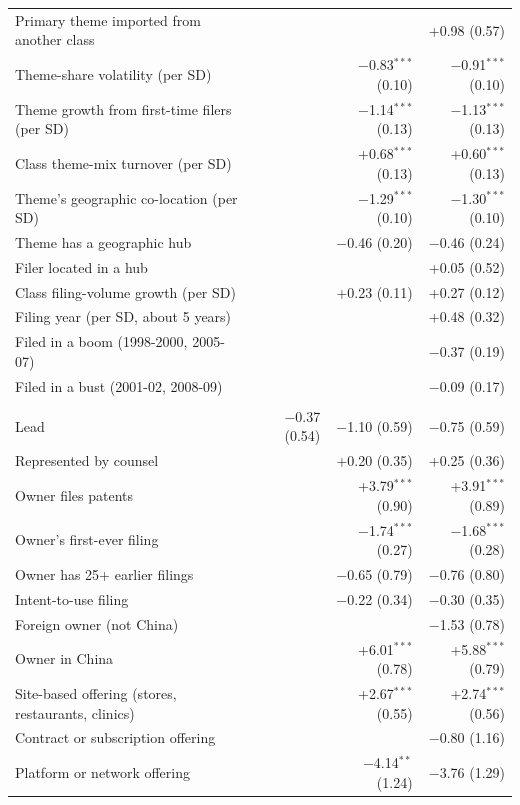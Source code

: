 \begin{small}
\begin{longtable}{>{\raggedright\arraybackslash}p{5.9cm}rrr}
\quad Primary theme imported from another class & &  & +0.98 (0.57) \\
\quad Theme-share volatility (per SD) & & $-$0.83$^{***}$ (0.10) & $-$0.91$^{***}$ (0.10) \\
\quad Theme growth from first-time filers (per SD) & & $-$1.14$^{***}$ (0.13) & $-$1.13$^{***}$ (0.13) \\
\quad Class theme-mix turnover (per SD) & & +0.68$^{***}$ (0.13) & +0.60$^{***}$ (0.13) \\
\quad Theme's geographic co-location (per SD) & & $-$1.29$^{***}$ (0.10) & $-$1.30$^{***}$ (0.10) \\
\quad Theme has a geographic hub & & $-$0.46 (0.20) & $-$0.46 (0.24) \\
\quad Filer located in a hub & &  & +0.05 (0.52) \\
\quad Class filing-volume growth (per SD) & & +0.23 (0.11) & +0.27 (0.12) \\
\quad Filing year (per SD, about 5 years) & &  & +0.48 (0.32) \\
\quad Filed in a boom (1998-2000, 2005-07) & &  & $-$0.37 (0.19) \\
\quad Filed in a bust (2001-02, 2008-09) & &  & $-$0.09 (0.17) \\
\addlinespace\multicolumn{4}{l}{\textbf{B. Change in the value of atypicality (points)}} \\
Lead & $-$0.37 (0.54) & $-$1.10 (0.59) & $-$0.75 (0.59) \\
\quad Represented by counsel & & +0.20 (0.35) & +0.25 (0.36) \\
\quad Owner files patents & & +3.79$^{***}$ (0.90) & +3.91$^{***}$ (0.89) \\
\quad Owner's first-ever filing & & $-$1.74$^{***}$ (0.27) & $-$1.68$^{***}$ (0.28) \\
\quad Owner has 25+ earlier filings & & $-$0.65 (0.79) & $-$0.76 (0.80) \\
\quad Intent-to-use filing & & $-$0.22 (0.34) & $-$0.30 (0.35) \\
\quad Foreign owner (not China) & &  & $-$1.53 (0.78) \\
\quad Owner in China & & +6.01$^{***}$ (0.78) & +5.88$^{***}$ (0.79) \\
\quad Site-based offering (stores, restaurants, clinics) & & +2.67$^{***}$ (0.55) & +2.74$^{***}$ (0.56) \\
\quad Contract or subscription offering & &  & $-$0.80 (1.16) \\
\quad Platform or network offering & & $-$4.14$^{**}$ (1.24) & $-$3.76 (1.29) \\

\end{longtable}
\end{small}
